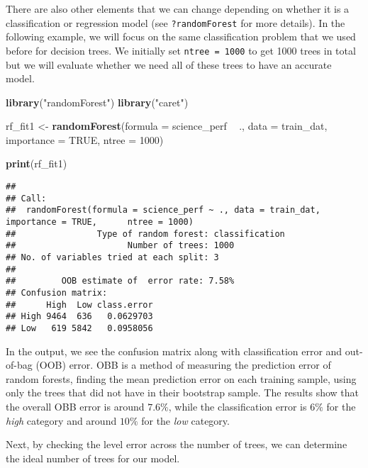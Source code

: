 \documentclass[]{book}
\newenvironment{Shaded}{\begin{snugshade}}{\end{snugshade}}
\newcommand{\DataTypeTok}[1]{\textcolor[rgb]{0.13,0.29,0.53}{#1}}
\newcommand{\DecValTok}[1]{\textcolor[rgb]{0.00,0.00,0.81}{#1}}
\newcommand{\KeywordTok}[1]{\textcolor[rgb]{0.13,0.29,0.53}{\textbf{#1}}}
\newcommand{\NormalTok}[1]{#1}
\newcommand{\OperatorTok}[1]{\textcolor[rgb]{0.81,0.36,0.00}{\textbf{#1}}}
\newcommand{\OtherTok}[1]{\textcolor[rgb]{0.56,0.35,0.01}{#1}}
\newcommand{\StringTok}[1]{\textcolor[rgb]{0.31,0.60,0.02}{#1}}
\begin{document}
There are also other elements that we can change depending on whether it is a classification or regression model (see \texttt{?randomForest} for more details). In the following example, we will focus on the same classification problem that we used before for decision trees. We initially set \texttt{ntree\ =\ 1000} to get 1000 trees in total but we will evaluate whether we need all of these trees to have an accurate model.

\begin{Shaded}
\begin{Highlighting}[]
\KeywordTok{library}\NormalTok{(}\StringTok{"randomForest"}\NormalTok{)}
\KeywordTok{library}\NormalTok{(}\StringTok{"caret"}\NormalTok{)}

\NormalTok{rf_fit1 <-}\StringTok{ }\KeywordTok{randomForest}\NormalTok{(}\DataTypeTok{formula =}\NormalTok{ science_perf }\OperatorTok{~}\StringTok{ }\NormalTok{.,}
                        \DataTypeTok{data =}\NormalTok{ train_dat,}
                        \DataTypeTok{importance =} \OtherTok{TRUE}\NormalTok{, }\DataTypeTok{ntree =} \DecValTok{1000}\NormalTok{)}

\KeywordTok{print}\NormalTok{(rf_fit1)}
\end{Highlighting}
\end{Shaded}

\begin{verbatim}
## 
## Call:
##  randomForest(formula = science_perf ~ ., data = train_dat, importance = TRUE,      ntree = 1000) 
##                Type of random forest: classification
##                      Number of trees: 1000
## No. of variables tried at each split: 3
## 
##         OOB estimate of  error rate: 7.58%
## Confusion matrix:
##      High  Low class.error
## High 9464  636   0.0629703
## Low   619 5842   0.0958056
\end{verbatim}

In the output, we see the confusion matrix along with classification error and out-of-bag (OOB) error. OBB is a method of measuring the prediction error of random forests, finding the mean prediction error on each training sample, using only the trees that did not have in their bootstrap sample. The results show that the overall OBB error is around \(7.6\%\), while the classification error is \(6\%\) for the \emph{high} category and around \(10\%\) for the \emph{low} category.

Next, by checking the level error across the number of trees, we can determine the ideal number of trees for our model.
\end{document}
